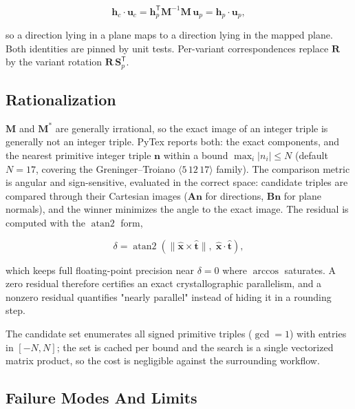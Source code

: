 \begin{equation}
\mathbf{h}_{c} \cdot \mathbf{u}_{c}
= \mathbf{h}_{p}^{\mathsf{T}} \mathbf{M}^{-1} \mathbf{M} \, \mathbf{u}_{p}
= \mathbf{h}_{p} \cdot \mathbf{u}_{p},
\end{equation}

so a direction lying in a plane maps to a direction lying in the mapped plane. Both identities
are pinned by unit tests. Per-variant correspondences replace $\mathbf{R}$ by the variant
rotation $\mathbf{R}\,\mathbf{S}_{p}^{\mathsf{T}}$.

\subsection{Rationalization}

$\mathbf{M}$ and $\mathbf{M}^{*}$ are generally irrational, so the exact image of an integer
triple is generally not an integer triple. PyTex reports both: the exact components, and the
nearest primitive integer triple $\mathbf{n}$ within a bound $\max_i |n_i| \le N$
(default $N = 17$, covering the Greninger--Troiano $\langle 5\,12\,17 \rangle$ family). The
comparison metric is angular and sign-sensitive, evaluated in the correct space: candidate
triples are compared through their Cartesian images ($\mathbf{A}\mathbf{n}$ for directions,
$\mathbf{B}\mathbf{n}$ for plane normals), and the winner minimizes the angle to the exact
image. The residual is computed with the $\operatorname{atan2}$ form,

\begin{equation}
\delta = \operatorname{atan2}\!\left(
  \lVert \hat{\mathbf{x}} \times \hat{\mathbf{t}} \rVert,\;
  \hat{\mathbf{x}} \cdot \hat{\mathbf{t}}
\right),
\end{equation}

which keeps full floating-point precision near $\delta = 0$ where $\arccos$ saturates. A zero
residual therefore certifies an exact crystallographic parallelism, and a nonzero residual
quantifies "nearly parallel" instead of hiding it in a rounding step.

The candidate set enumerates all signed primitive triples ($\gcd = 1$) with entries in
$[-N, N]$; the set is cached per bound and the search is a single vectorized matrix product, so
the cost is negligible against the surrounding workflow.

\subsection{Failure Modes And Limits}

